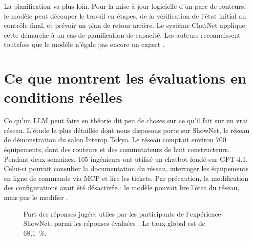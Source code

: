 La planification va plus loin. Pour la mise à jour logicielle d'un parc de routeurs, le modèle peut découper le travail en étapes, de la vérification de l'état initial au contrôle final, et prévoir un plan de retour arrière. Le système ChatNet applique cette démarche à un cas de planification de capacité. Les auteurs reconnaissent toutefois que le modèle n'égale pas encore un expert \cite{huang2024}.

\section{Ce que montrent les évaluations en conditions réelles}
\label{sec:evaluations}

Ce qu'un LLM peut faire en théorie dit peu de choses sur ce qu'il fait sur un vrai réseau. L'étude la plus détaillée dont nous disposons porte sur ShowNet, le réseau de démonstration du salon Interop Tokyo. Le réseau comptait environ 700 équipements, dont des routeurs et des commutateurs de huit constructeurs. Pendant deux semaines, 105 ingénieurs ont utilisé un chatbot fondé sur GPT-4.1. Celui-ci pouvait consulter la documentation du réseau, interroger les équipements en ligne de commande via MCP et lire les tickets. Par précaution, la modification des configurations avait été désactivée : le modèle pouvait lire l'état du réseau, mais pas le modifier \cite{nakamura2026}.

\begin{figure}[htbp]
\centering
\begin{minipage}[b]{0.52\textwidth}
\centering
{}
\end{minipage}\hfill
\begin{minipage}[b]{0.44\textwidth}
\centering
{}
\end{minipage}
\caption{Part des réponses jugées utiles par les participants de l'expérience ShowNet, parmi les réponses évaluées \cite{nakamura2026}. Le taux global est de 68,1~\%.}
\label{fig:shownet}
\end{figure}

